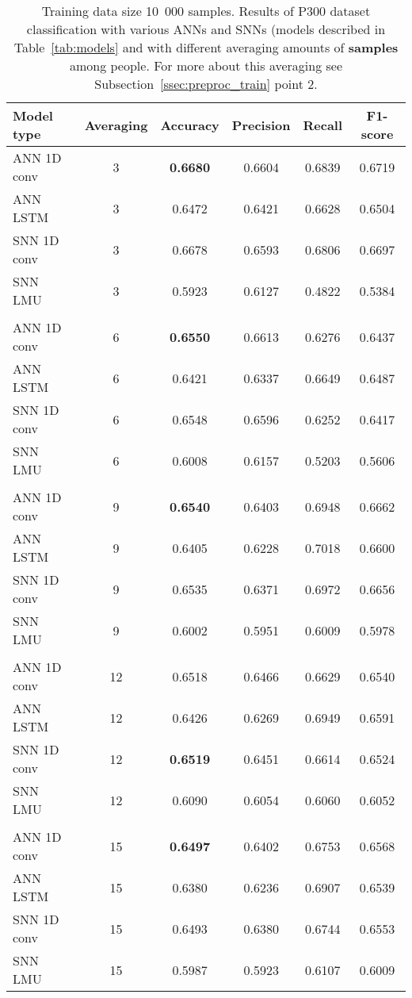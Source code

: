 \begin{table}[ht!]
	\centering
	\begin{tabular}{l c c c c c}
		\hline
		Model type & Averaging & Accuracy & Precision & Recall & F1-score \\
		\hline
		ANN 1D conv & 3 & \textbf{0.6680} & 0.6604 & 0.6839 & 0.6719 \\
		ANN LSTM    & 3 & 0.6472 & 0.6421 & 0.6628 & 0.6504 \\
		SNN 1D conv & 3 & 0.6678 & 0.6593 & 0.6806 & 0.6697 \\
		SNN LMU     & 3 & 0.5923 & 0.6127 & 0.4822 & 0.5384 \\
		\\
		ANN 1D conv & 6 & \textbf{0.6550} & 0.6613 & 0.6276 & 0.6437 \\
		ANN LSTM    & 6 & 0.6421 & 0.6337 & 0.6649 & 0.6487 \\
		SNN 1D conv & 6 & 0.6548 & 0.6596 & 0.6252 & 0.6417 \\
		SNN LMU     & 6 & 0.6008 & 0.6157 & 0.5203 & 0.5606 \\
		\\
		ANN 1D conv & 9 & \textbf{0.6540} & 0.6403 & 0.6948 & 0.6662 \\
		ANN LSTM    & 9 & 0.6405 & 0.6228 & 0.7018 & 0.6600 \\
		SNN 1D conv & 9 & 0.6535 & 0.6371 & 0.6972 & 0.6656 \\
		SNN LMU     & 9 & 0.6002 & 0.5951 & 0.6009 & 0.5978 \\
		\\
		ANN 1D conv & 12 & 0.6518 & 0.6466 & 0.6629 & 0.6540 \\
		ANN LSTM    & 12 & 0.6426 & 0.6269 & 0.6949 & 0.6591 \\
		SNN 1D conv & 12 & \textbf{0.6519} & 0.6451 & 0.6614 & 0.6524 \\
		SNN LMU     & 12 & 0.6090 & 0.6054 & 0.6060 & 0.6052 \\
		\\
		ANN 1D conv & 15 & \textbf{0.6497} & 0.6402 & 0.6753 & 0.6568 \\
		ANN LSTM    & 15 & 0.6380 & 0.6236 & 0.6907 & 0.6539 \\
		SNN 1D conv & 15 & 0.6493 & 0.6380 & 0.6744 & 0.6553 \\
		SNN LMU     & 15 & 0.5987 & 0.5923 & 0.6107 & 0.6009 \\
		\hline
	\end{tabular}
	\caption{Training data size 10~000 samples. Results of P300 dataset classification with various ANNs and SNNs (models described in Table~\ref{tab:models} and with different averaging amounts of \textbf{samples} among people. For more about this averaging see Subsection~\ref{ssec:preproc_train} point 2.}
	\label{tab:results_samples_10000}
\end{table}

